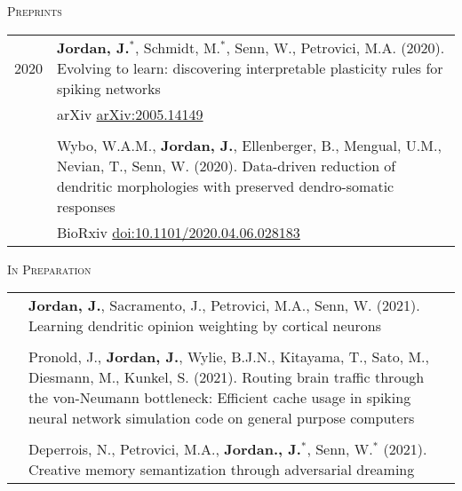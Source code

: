\textsc{Preprints}
\begin{longtable}{>{\hfill}p{1.6cm} p{}}
  2020 & \textbf{Jordan, J.}$^*$, Schmidt, M.$^*$, Senn, W., Petrovici, M.A. (2020). Evolving to learn: discovering interpretable plasticity rules for spiking networks \\
       & arXiv \href{https://arxiv.org/abs/2005.14149}{arXiv:2005.14149} \\
  \multicolumn{2}{c}{} \\
       & Wybo, W.A.M., \textbf{Jordan, J.}, Ellenberger, B., Mengual, U.M., Nevian, T., Senn, W. (2020). Data-driven reduction of dendritic morphologies with preserved dendro-somatic responses \\
       & BioRxiv \href{https://doi.org/10.1101/2020.04.06.028183}{doi:10.1101/2020.04.06.028183}
\end{longtable}

\textsc{In Preparation}
\begin{longtable}{>{\hfill}p{1.6cm} p{}}
  & \textbf{Jordan, J.}, Sacramento, J., Petrovici, M.A., Senn, W. (2021). Learning dendritic opinion weighting by cortical neurons \\
  \multicolumn{2}{c}{} \\
  & Pronold, J., \textbf{Jordan, J.}, Wylie, B.J.N., Kitayama, T., Sato, M., Diesmann, M., Kunkel, S. (2021). Routing brain traffic through the von-Neumann bottleneck: Efficient cache usage in spiking neural network simulation code on general purpose computers \\
  \multicolumn{2}{c}{} \\
  & Deperrois, N., Petrovici, M.A., \textbf{Jordan., J.}$^*$, Senn, W.$^*$ (2021). Creative memory semantization through adversarial dreaming \\
\end{longtable}

